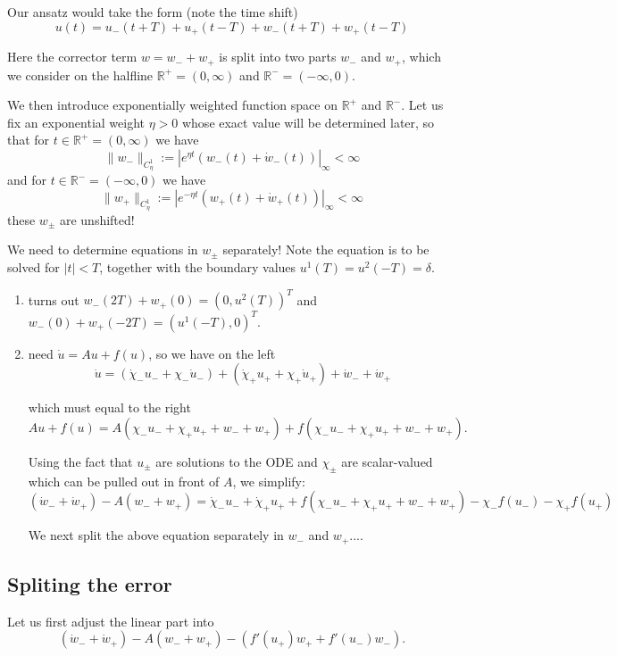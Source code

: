 \documentclass[letterpaper,11pt]{article}
\numberwithin{equation}{section}
\theoremstyle{plain}
\begin{document}
Our ansatz would take the form (note the time shift)
\[
u(t) =  u_-(t+T) + u_+(t-T)+w_-(t+T)+w_+(t-T)
\]

Here the corrector term $w=w_-+w_+$ is split into two parts $w_-$ and $w_+$, which we consider on the halfline $\mathbb{R}^+ = (0,\infty)$ and $\mathbb{R}^- = (-\infty,0)$.

We then introduce exponentially weighted function space on $\mathbb{R}^+$ and $\mathbb{R}^-$. Let us fix an exponential weight $\eta>0$ whose exact value will be determined later, so that for $t \in \mathbb{R}^+ =(0,\infty)$ we have
\[
\|w_-\|_{C^1_\eta}:=|e^{\eta t} (w_-(t)+\dot{w}_-(t))|_{\infty} < \infty 
\]   
and for $t \in \mathbb{R}^- =(-\infty,0)$ we have
\[
\|w_+\|_{C^1_\eta}:= |e^{-\eta t} (w_+(t)+\dot{w}_+(t))|_{\infty} < \infty
\]
these $w_\pm$ are unshifted!     




We need to determine equations in $w_{\pm}$ separately! Note the equation is to be solved for $|t|<T$, together with the boundary values $u^1(T) = u^2(-T) = \delta$.

\begin{enumerate}
\item turns out $w_-(2T)+w_+(0) =  (0,u^2(T))^T$ and $w_-(0)+w_+(-2T)=(u^1(-T),0)^T$. 

\item need $\dot{u} = Au+ f(u)$, so we have on the left
\[
\dot{u}=(\dot{\chi}_- u_- +\chi_- \dot{u}_- )+(\dot{\chi}_+ u_+ +\chi_+ \dot{u}_+ )+\dot{w}_-+\dot{w}_+
\]

which must equal to the right
\[
Au+f(u)=A(\chi_- u_- + \chi_+ u_+ + w_-+w_+)+f(\chi_- u_- + \chi_+ u_+ + w_-+w_+).
\]

Using the fact that $u_{\pm}$ are solutions to the ODE and $\chi_{\pm}$ are scalar-valued which can be pulled out in front of $A$, we simplify:
\[
(\dot{w}_-+\dot{w}_+)-A(w_-+w_+) =  \dot{\chi}_-  u_- + \dot{\chi}_+ u_+ + f(\chi_-u_-+\chi_+u_+ + w_- + w_+) - \chi_- f(u_-)-\chi_+f(u_+)
\]

We next split the above equation separately in $w_-$ and $w_+$....			
\end{enumerate}

\subsection{Spliting the error}
Let us first adjust the linear part into
\[
(\dot{w}_-+\dot{w}_+)-A(w_-+w_+) -(f'(u_+)w_+ +f'(u_-)w_-).
\]
\end{document}
